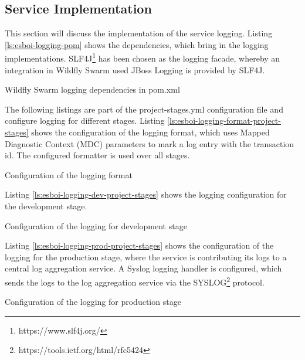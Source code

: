 \subsection{Service Implementation}
\label{sec:esbi-logging-service}
This section will discuss the implementation of the service logging. Listing \vref{ls:esboi-logging-pom} shows the dependencies, which bring in the logging implementations. SLF4J\footnote{https://www.slf4j.org/} has been chosen as the logging facade, whereby an integration in Wildfly Swarm used JBoss Logging is provided by SLF4J.

\begin{listing}
	\caption{Wildfly Swarm logging dependencies in pom.xml}
	\label{ls:esboi-logging-pom}
\end{listing}

The following listings are part of the project-stages.yml configuration file and configure logging for different stages. Listing \vref{ls:esboi-logging-format-project-stages} shows the configuration of the logging format, which uses Mapped Diagnostic Context (MDC) parameters to mark a log entry with the transaction id. The configured formatter is used over all stages.

\begin{listing}
	\caption{Configuration of the logging format}
	\label{ls:esboi-logging-format-project-stages}
\end{listing}

Listing \vref{ls:esboi-logging-dev-project-stages} shows the logging configuration for the development stage.

\begin{listing}
	\caption{Configuration of the logging for development stage}
	\label{ls:esboi-logging-dev-project-stages}
\end{listing}

Listing \vref{ls:esboi-logging-prod-project-stages} shows the configuration of the logging for the production stage, where the service is contributing its logs to a central log aggregation service. A Syslog logging handler is configured, which sends the logs to the log aggregation service via the SYSLOG\footnote{https://tools.ietf.org/html/rfc5424} protocol.

\begin{listing}
	\caption{Configuration of the logging for production stage}
	\label{ls:esboi-logging-prod-project-stages}
\end{listing}


